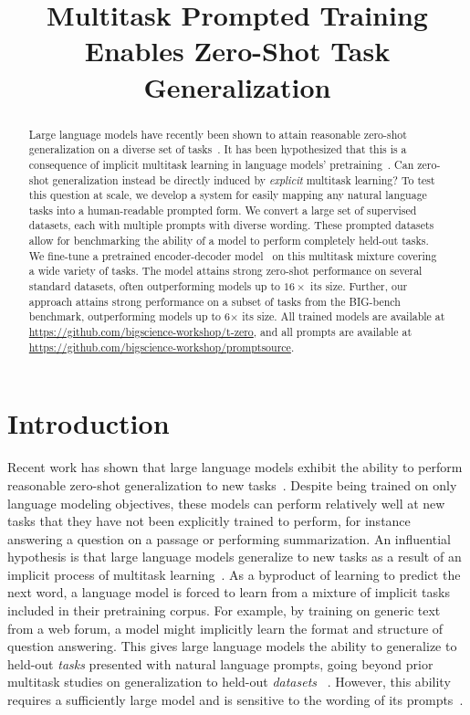 \title{Multitask Prompted Training Enables Zero-Shot Task Generalization}

\begin{abstract}
Large language models have recently been shown to attain reasonable zero-shot generalization on a diverse set of tasks~\citep{gpt3}. It has been hypothesized that this is a consequence of implicit multitask learning in language models' pretraining~\citep{radford2019language}. Can zero-shot generalization instead be directly induced by \textit{explicit} multitask learning? To test this question at scale, we develop a system for easily mapping any natural language tasks into a human-readable prompted form. We convert a large set of supervised datasets, each with multiple prompts with diverse wording. These prompted datasets allow for benchmarking the ability of a model to perform completely held-out tasks. We fine-tune a pretrained encoder-decoder model~\citep{t5,lester_prompt} on this multitask mixture covering a wide variety of tasks. The model attains strong zero-shot performance on several standard datasets, often outperforming models up to $16 \times$ its size. Further, our approach attains strong performance on a subset of tasks from the BIG-bench benchmark, outperforming models up to 6$\times$ its size. All trained models are available at \url{https://github.com/bigscience-workshop/t-zero}, and all prompts are available at \url{https://github.com/bigscience-workshop/promptsource}.
\end{abstract}

\section{Introduction}
Recent work has shown that large language models exhibit the ability to perform reasonable zero-shot generalization to new tasks~\citep{gpt3,kim2021changes}. Despite being trained on only language modeling objectives, these models can perform relatively well at new tasks that they have not been explicitly trained to perform, for instance answering a question on a passage or performing summarization. An influential hypothesis is that large language models generalize to new tasks as a result of an implicit process of multitask learning~\citep{radford2019language}. As a byproduct of learning to predict the next word, a language model is forced to learn from a mixture of implicit tasks included in their pretraining corpus. For example, by training on generic text from a web forum, a model might implicitly learn the format and structure of question answering. This gives large language models the ability to generalize to held-out \textit{tasks} presented with natural language prompts, going beyond prior multitask studies on generalization to held-out \textit{datasets} ~\citep{unifiedqa,ye2021crossfit}. However, this ability requires a sufficiently large model and is sensitive to the wording of its prompts~\citep{true-zero-shot,zhao2021calibrate,master-translator}.

